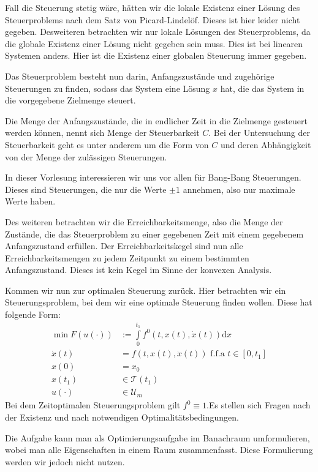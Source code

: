 \documentclass[pdftex,a4paper,oneside]{scrbook}
\begin{document}
	Fall die Steuerung stetig wäre, hätten wir die lokale Existenz einer Lösung des Steuerproblems nach dem Satz von Picard-Lindelöf. Dieses ist hier leider nicht gegeben. 
	Desweiteren betrachten wir nur lokale Lösungen des Steuerproblems, da die globale Existenz einer Lösung nicht gegeben sein muss. Dies ist bei linearen Systemen anders. Hier ist die Existenz einer globalen Steuerung immer gegeben. 
	
	Das Steuerproblem besteht nun darin, Anfangszustände und zugehörige Steuerungen zu finden, sodass das System eine Lösung $x$ hat, die das System in die vorgegebene Zielmenge steuert. 
	
	Die Menge der Anfangszustände, die in endlicher Zeit in die Zielmenge gesteuert werden können, nennt sich Menge der Steuerbarkeit $C$. Bei der Untersuchung der Steuerbarkeit geht es unter anderem um die Form von $C$ und deren Abhängigkeit von der Menge der zulässigen Steuerungen. 
	
	In dieser Vorlesung interessieren wir uns vor allen für Bang-Bang Steuerungen. Dieses sind Steuerungen, die nur die Werte $\pm 1$ annehmen, also nur maximale Werte haben. 
	
	Des weiteren betrachten wir die Erreichbarkeitsmenge, also die Menge der Zustände, die das Steuerproblem zu einer gegebenen Zeit mit einem gegebenem Anfangszustand erfüllen.
	Der Erreichbarkeitskegel sind nun alle Erreichbarkeitsmengen zu jedem Zeitpunkt zu einem bestimmten Anfangszustand. Dieses ist kein Kegel im Sinne der konvexen Analysis. %
	
	Kommen wir nun zur optimalen Steuerung zurück. Hier betrachten wir ein Steuerungsproblem, bei dem wir eine optimale Steuerung finden wollen. Diese hat folgende Form:
	\begin{align*}
	\min F(u(\cdot) ) & := \int\limits_0^{t_1} f^0(t,x(t),\dot{x}(t)) \mathrm{d}x \\
	\dot{x}(t) &= f(t,x(t), \dot{x}(t)) \text{ f.f.a } t \in [0,t_1] \\
	x(0) & = x_0 \\
	x(t_1) & \in \mathcal{T}(t_1) \\
	u(\cdot) & \in \mathcal{U}_m	
	\end{align*}
	Bei dem Zeitoptimalen Steuerungsproblem gilt $f^0 \equiv 1$.Es stellen sich Fragen nach der Existenz und nach notwendigen Optimalitätsbedingungen.
	
	Die Aufgabe kann man als Optimierungsaufgabe im Banachraum umformulieren, wobei man alle Eigenschaften in einem Raum zusammenfasst. Diese Formulierung werden wir jedoch nicht nutzen. 
	
\end{document}
